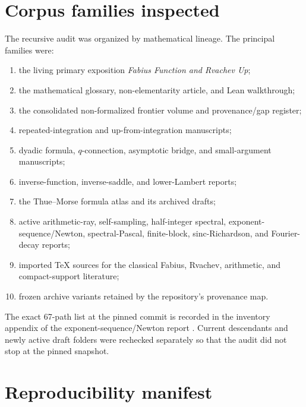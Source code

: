 \documentclass[11pt,oneside]{article}
\theoremstyle{definition}
\theoremstyle{remark}
\newcommand{\1}{\mathbf 1}
\begin{document}
\section{Corpus families inspected}
\label{p8:app:corpus}

The recursive audit was organized by mathematical lineage.  The principal
families were:
\begin{enumerate}
\item the living primary exposition \emph{Fabius Function and Rvachev Up};
\item the mathematical glossary, non-elementarity article, and Lean walkthrough;
\item the consolidated non-formalized frontier volume and provenance/gap register;
\item repeated-integration and up-from-integration manuscripts;
\item dyadic formula, \(q\)-connection, asymptotic bridge, and small-argument
      manuscripts;
\item inverse-function, inverse-saddle, and lower-Lambert reports;
\item the Thue--Morse formula atlas and its archived drafts;
\item active arithmetic-ray, self-sampling, half-integer spectral, exponent-
      sequence/Newton, spectral-Pascal, finite-block, sinc-Richardson, and
      Fourier-decay reports;
\item imported TeX sources for the classical Fabius, Rvachev, arithmetic, and
      compact-support literature;
\item frozen archive variants retained by the repository's provenance map.
\end{enumerate}
The exact 67-path list at the pinned commit is recorded in the inventory appendix
of the exponent-sequence/Newton report \cite{p8:proveitNewton}.  Current descendants
and newly active draft folders were rechecked separately so that the audit did
not stop at the pinned snapshot.

\section{Reproducibility manifest}
\label{p8:app:manifest}
\end{document}
